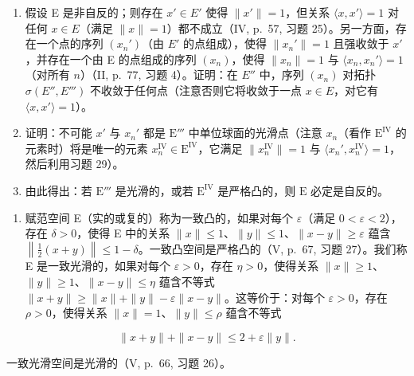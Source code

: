 \begin{enumerate}
\def\labelenumi{\alph{enumi})}
\item
  假设 E 是非自反的；则存在 \(x' \in E'\) 使得 \(\| x' \| = 1\)，但关系 \(\langle x, x' \rangle = 1\) 对任何 \(x \in E\)（满足 \(\| x \| = 1\)）都不成立（IV, p.~57, 习题 25）。另一方面，存在一个点的序列 \((x_n')\)（由 \(E'\) 的点组成），使得 \(\| x_n' \| = 1\) 且强收敛于 \(x'\)，并存在一个由 E 的点组成的序列 \((x_n)\)，使得 \(\| x_n \| = 1\) 与 \(\langle x_n, x_n' \rangle = 1\)（对所有 \(n\)）（II, p.~77, 习题 4）。证明：在 \(E''\) 中，序列 \((x_n)\) 对拓扑 \(\sigma(E'', E''')\) 不收敛于任何点（注意否则它将收敛于一点 \(x \in E\)，对它有 \(\langle x, x' \rangle = 1\)）。
\item
  证明：不可能 \(x'\) 与 \(x_n'\) 都是 \(\mathrm{E}'''\) 中单位球面的光滑点（注意 \(x_n\)（看作 \(\mathrm{E}^{\mathrm{IV}}\) 的元素时）将是唯一的元素 \(x_n^{\mathrm{IV}} \in \mathrm{E}^{\mathrm{IV}}\)，它满足 \(\| x_n^{\mathrm{IV}} \| = 1\) 与 \(\langle x_n', x_n^{\mathrm{IV}} \rangle = 1\)，然后利用习题 29）。
\item
  由此得出：若 \(\mathrm{E}'''\) 是光滑的，或若 \(\mathrm{E}^{\mathrm{IV}}\) 是严格凸的，则 \(\mathrm{E}\) 必定是自反的。
\end{enumerate}

\begin{enumerate}
\def\labelenumi{\arabic{enumi})}
\setcounter{enumi}{30}
\tightlist
\item
  赋范空间 E（实的或复的）称为一致凸的，如果对每个 \(\varepsilon\)（满足 \(0 < \varepsilon < 2\)），存在 \(\delta > 0\)，使得 E 中的关系 \(\|x\| \leqslant 1\)、\(\|y\| \leqslant 1\)、\(\|x - y\| \geqslant \varepsilon\) 蕴含 \(\left\|\frac{1}{2}(x + y)\right\| \leqslant 1 - \delta\)。一致凸空间是严格凸的（V, p.~67, 习题 27）。我们称 E 是一致光滑的，如果对每个 \(\varepsilon > 0\)，存在 \(\eta > 0\)，使得关系 \(\|x\| \geqslant 1\)、\(\|y\| \geqslant 1\)、\(\|x - y\| \leqslant \eta\) 蕴含不等式 \(\|x + y\| \geqslant \|x\| + \|y\| - \varepsilon \|x - y\|\)。这等价于：对每个 \(\varepsilon > 0\)，存在 \(\rho > 0\)，使得关系 \(\|x\| = 1\)、\(\|y\| \leqslant \rho\) 蕴含不等式
\end{enumerate}

\[
\| x + y \| + \| x - y \| \leqslant 2 + \varepsilon \| y \|.
\]

一致光滑空间是光滑的（V, p.~66, 习题 26）。

